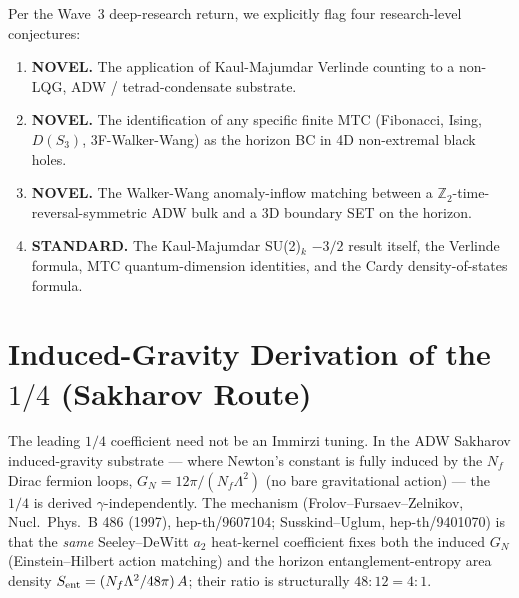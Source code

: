 \documentclass[aps,prd,twocolumn,showpacs,superscriptaddress,nofootinbib]{revtex4-2}
\newcommand{\Imm}{\gamma}
\begin{document}
Per the Wave~3 deep-research return, we explicitly flag four
research-level conjectures:
\begin{enumerate}
  \item \textbf{NOVEL.} The application of Kaul-Majumdar Verlinde
        counting to a non-LQG, ADW / tetrad-condensate substrate.
  \item \textbf{NOVEL.} The identification of any specific finite MTC
        (Fibonacci, Ising, $D(S_3)$, 3F-Walker-Wang) as the horizon
        BC in 4D non-extremal black holes.
  \item \textbf{NOVEL.} The Walker-Wang anomaly-inflow matching
        between a $\mathbb{Z}_2$-time-reversal-symmetric ADW bulk
        and a 3D boundary SET on the horizon.
  \item \textbf{STANDARD.} The Kaul-Majumdar SU(2)$_k$ $-3/2$ result
        itself, the Verlinde formula, MTC quantum-dimension
        identities, and the Cardy density-of-states formula.
\end{enumerate}

\section{Induced-Gravity Derivation of the $1/4$ (Sakharov Route)}
\label{sec:induced-quarter}

The leading $1/4$ coefficient need not be an Immirzi tuning. In the ADW Sakharov
induced-gravity substrate --- where Newton's constant is fully induced by the $N_f$
Dirac fermion loops, $G_N = 12\pi/(N_f \Lambda^2)$ (no bare gravitational action) ---
the $1/4$ is derived $\Imm$-independently. The mechanism (Frolov--Fursaev--Zelnikov,
Nucl.\ Phys.\ B 486 (1997), hep-th/9607104; Susskind--Uglum, hep-th/9401070) is that the
\emph{same} Seeley--DeWitt $a_2$ heat-kernel coefficient fixes both the induced $G_N$
(Einstein--Hilbert action matching) and the horizon entanglement-entropy area density
$S_{\rm ent} = (N_f \Lambda^2/48\pi)\,A$; their ratio is structurally $48:12 = 4:1$.
\end{document}

